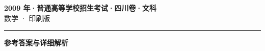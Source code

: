 \documentclass[zihao=5, a4paper]{ctexart}
\begin{document}
\begin{center}
  {\Large\bfseries 2009 年·普通高等学校招生考试·四川卷·文科}\\[4pt]
  {\large 数学 · 印刷版}
\end{center}
\medskip
{}

\par\bigskip\hrule\bigskip
{}
\begin{center}{\large\bfseries 参考答案与详细解析}\end{center}
\smallskip

\end{document}
